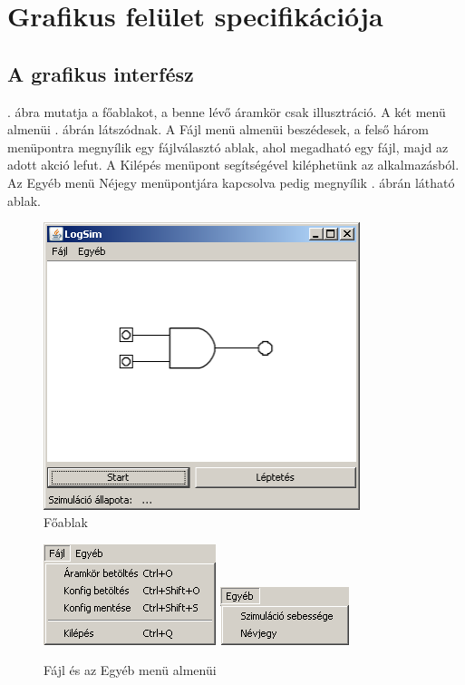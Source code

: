 %
\chapter{Grafikus felület specifikációja}

\thispagestyle{fancy}

\section{A grafikus interfész}

. ábra mutatja a főablakot, a benne lévő áramkör csak illusztráció. A két menü almenüi . ábrán látszódnak. A Fájl menü almenüi beszédesek, a felső három menüpontra megnyílik egy fájlválasztó ablak, ahol megadható egy fájl, majd az adott akció lefut. A Kilépés menüpont segítségével kiléphetünk az alkalmazásból. Az Egyéb menü Néjegy menüpontjára kapcsolva pedig megnyílik . ábrán látható ablak.

\begin{figure}[H]
\begin{center}
\includegraphics[width=3.64in]{chapters/chapter11/screenshots/felulet.png}
\caption{Főablak}
\label{fig:main}
\end{center}
\end{figure}

\begin{figure}[H]
\begin{center}
\includegraphics[width=1.98in]{chapters/chapter11/screenshots/menus1.png}
\includegraphics[width=1.479in]{chapters/chapter11/screenshots/menus2.png}
\caption{Fájl és az Egyéb menü almenüi}
\label{fig:menus}
\end{center}
\end{figure}


